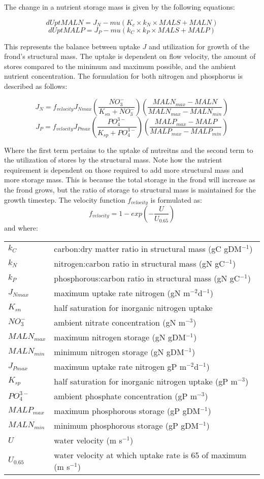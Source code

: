 \documentclass{deltares_manual}
\begin{document}
The change in a nutrient storage mass is given by the following equations:

\[dUptMALN = J_N - mu(K_c \times k_N \times MALS + MALN)\]
\[dUptMALP = J_P - mu(k_C \times k_P \times MALS + MALP)\]

This represents the balance between uptake $J$ and utilization for growth of the frond's structural mass. The uptake is dependent on flow velocity, the amount of stores compared to the minimum and maximum possible, and the ambient nutrient concentration. The formulation for both nitrogen and phosphorus is described as follows:

\[J_N = f_{velocity}J_{Nmax}(\frac{NO_3^-}{K_{sn}+NO_3^-})(\frac{MALN_{max}-MALN}{MALN_{max}-MALN_{min}})\]
\[J_P = f_{velocity}J_{Pmax}(\frac{PO_4^{3-}}{K_{sp}+PO_4^{3-}})(\frac{MALP_{max}-MALP}{MALP_{max}-MALP_{min}})\]

Where the first term pertains to the uptake of nutreitns and the second term to the utilization of stores by the structural mass. Note how the nutrient requirement is dependent on those required to add more structural mass and more storage mass. This is because the total storage in the frond will increase as the frond grows, but the ratio of storage to structural mass is maintained for the growth timestep. The velocity function $f_{velocity}$ is formulated as:
\[f_{velocity} = 1-exp(-\frac{U}{U_{0.65}})\]
and where:\\
\begin{tabular}{ll}
$k_C$        & carbon:dry matter ratio in structural mass (gC gDM$^{-1}$)\\
$k_N$        & nitrogen:carbon ratio in structural mass (gN gC$^{-1}$)\\
$k_P$        & phosphorous:carbon ratio in structural mass (gN gC$^{-1}$)\\
$J_{Nmax}$   & maximum uptake rate nitrogen (gN m$^{-2}$d$^{-1}$)\\
$K_{sn}$     & half saturation for inorganic nitrogen uptake\\
$NO_3^-$     & ambient nitrate concentration (gN m$^{-3}$)\\
$MALN_{max}$ & maximum nitrogen storage (gN gDM$^{-1}$)\\
$MALN_{min}$ & minimum nitrogen storage (gN gDM$^{-1}$)\\
$J_{Pmax}$   & maximum uptake rate nitrogen gP m$^{-2}$d$^{-1}$)\\
$K_{sp}$     & half saturation for inorganic nitrogen uptake (gP m$^{-3}$)\\
$PO_4^{3-}$  & ambient phosphate concentration (gP m$^{-3}$)\\
$MALP_{max}$ & maximum phosphorous storage (gP gDM$^{-1}$)\\
$MALN_{min}$ & minimum phosphorous storage (gP gDM$^{-1}$)\\
$U$          & water velocity (m s$^{-1}$)\\
$U_{0.65}$   & water velocity at which uptake rate is 65 of maximum (m s$^{-1}$)\\
\end{tabular}
\end{document}
